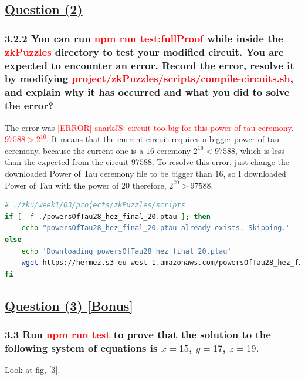 \documentclass[letterpaper, 10 pt, conference]{ieeeconf}  %
\begin{document}
\subsection{\textbf{\underline{Question (2)}}}

\subsubsection{\textbf{\underline{3.2.2} You can run \textcolor{red}{npm run test:fullProof} while inside the \textcolor{red}{zkPuzzles} directory to test your modified circuit. You are expected to encounter an error. Record the error, resolve it by modifying \textcolor{red}{project/zkPuzzles/scripts/compile-circuits.sh}, and explain why it has occurred and what you did to solve the error?}}

The error was \textcolor{red}{[ERROR] snarkJS: circuit too big for this power of tau ceremony. $97588 > 2^{16}$}.
It means that the current circuit requires a bigger power of tau ceremony, because the current one is a $16$ ceremony $2^{16} < 97588$, which is less than the expected from the circuit $97588$. To resolve this error, just change the downloaded Power of Tau ceremony file to be bigger than $16$, so I downloaded Power of Tau with the power of $20$ therefore, $2^{20} > 97588$.

\begin{lstlisting}[language=Bash, caption=Expected solution]
# ./zku/week1/Q3/projects/zkPuzzles/scripts
if [ -f ./powersOfTau28_hez_final_20.ptau ]; then
    echo "powersOfTau28_hez_final_20.ptau already exists. Skipping."
else
    echo 'Downloading powersOfTau28_hez_final_20.ptau'
    wget https://hermez.s3-eu-west-1.amazonaws.com/powersOfTau28_hez_final_20.ptau
fi
\end{lstlisting}

\subsection{\textbf{\underline{Question (3) [Bonus]}}}
\subsubsection{\textbf{\underline{3.3} Run \textcolor{red}{npm run test} to prove that the solution to the following system of equations is $x=15$, $y=17$, $z=19$.}}

Look at fig, [3].
\end{document}
